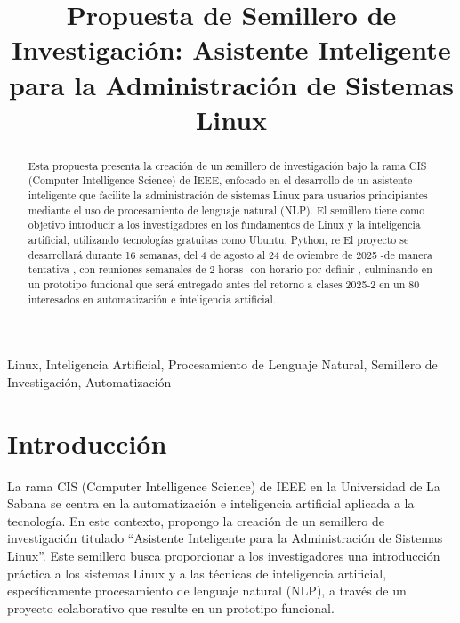 \documentclass[conference, a4paper]{IEEEtran}
\begin{document}
\title{Propuesta de Semillero de Investigación: Asistente Inteligente para la Administración de Sistemas Linux}

\author{
}

\maketitle

\begin{abstract}
Esta propuesta presenta la creación de un semillero de investigación bajo la rama CIS (Computer Intelligence Science) de IEEE, enfocado en el 
desarrollo de un asistente inteligente que facilite la administración de sistemas Linux para usuarios principiantes mediante el uso de procesamiento 
de lenguaje natural (NLP). El semillero tiene como objetivo introducir a los investigadores en los fundamentos de Linux y la inteligencia artificial, 
utilizando tecnologías gratuitas como Ubuntu, Python, re El proyecto se desarrollará durante 16 semanas, del 4 de agosto al 24 de 
oviembre de 2025 -de manera tentativa-, con reuniones semanales de 2 horas -con horario por definir-, culminando en un prototipo funcional que 
será entregado antes del retorno a clases 2025-2 en un 80%
interesados en automatización e inteligencia artificial.
\end{abstract}

\begin{IEEEkeywords}
Linux, Inteligencia Artificial, Procesamiento de Lenguaje Natural, Semillero de Investigación, Automatización
\end{IEEEkeywords}

\section{Introducción}
La rama CIS (Computer Intelligence Science) de IEEE en la Universidad de La Sabana se centra en la automatización e inteligencia artificial aplicada 
a la tecnología. En este contexto, propongo la creación de un semillero de investigación titulado ``Asistente Inteligente para la Administración de 
Sistemas Linux''. Este semillero busca proporcionar a los investigadores una introducción práctica a los sistemas Linux y a las técnicas de 
inteligencia artificial, específicamente procesamiento de lenguaje natural (NLP), a través de un proyecto colaborativo que resulte en un prototipo 
funcional.
\end{document}
